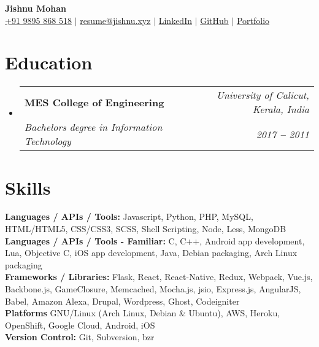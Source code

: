 \documentclass[letterpaper,11pt]{article}
\makeatletter
\newcommand{\resumeEducationHeading}[4]{
  \vspace{-2pt}\item
    \begin{tabular*}{0.97\textwidth}[t]{l@{\extracolsep{\fill}}r}
      \textbf{#1} & \textit{\small#2} \\
      \textit{\small#3} & \textit{\small #4} \\
    \end{tabular*}\vspace{-5pt}
}
\newcommand{\resumeSubHeadingListStart}{\begin{itemize}[leftmargin=0.15in, label={}]}
\newcommand{\resumeSubHeadingListEnd}{\end{itemize}}
\makeatother
\begin{document}

\begin{center}
    \textbf{\Huge \sffamily\mdseries\upshape Jishnu Mohan} \\ \vspace{3pt}
    \small
    \faMobile \hspace{.5pt} \href{tel:9895868518}{+91 9895 868 518}
    $|$
    \faAt \hspace{.5pt} \href{mailto:resume@jishnu.xyz}{resume@jishnu.xyz}
    $|$
    \faLinkedinSquare \hspace{.5pt} \href{https://www.linkedin.com/in/jishnu7}{LinkedIn}
    $|$
    \faGithub \hspace{.5pt} \href{https://github.com/jishnu7}{GitHub}
    $|$
    \faGlobe \hspace{.5pt} \href{https://j15h.nu}{Portfolio}
\end{center}




\section{Education}
  \vspace{3pt}
  \resumeSubHeadingListStart
    \resumeEducationHeading
      {MES College of Engineering
      }{University of Calicut, Kerala, India}
      {Bachelors degree in Information Technology}{2017 \textbf{--} 2011}
      \resumeSubHeadingListEnd


\section{Skills}
  \vspace{2pt}
  \resumeSubHeadingListStart
    \small{\item{
        \textbf{Languages / APIs / Tools:}{ Javascript, Python, PHP, MySQL, HTML/HTML5, CSS/CSS3, SCSS, Shell Scripting, Node, Less, MongoDB} \\ \vspace{3pt}
        \textbf{Languages / APIs / Tools - Familiar:}{ C, C++, Android app development, Lua, Objective C, iOS app development, Java, Debian packaging, Arch Linux packaging} \\ \vspace{3pt}
        \textbf{Frameworks / Libraries:}{ Flask, React, React-Native, Redux, Webpack, Vue.js, Backbone.js, GameClosure, Memcached, Mocha.js, jsio, Express.js, AngularJS, Babel, Amazon Alexa, Drupal, Wordpress, Ghost, Codeigniter} \\ \vspace{3pt}
        \textbf{Platforms}{ GNU/Linux (Arch Linux, Debian \& Ubuntu), AWS, Heroku, OpenShift, Google Cloud, Android, iOS} \\ \vspace{3pt}
        \textbf{Version Control:}{ Git, Subversion, bzr}
    }}
  \resumeSubHeadingListEnd
\end{document}
